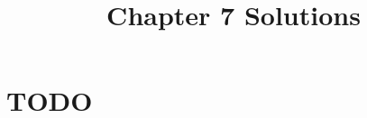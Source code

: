 \documentclass[12pt]{article}
\title{Chapter 7 Solutions}
\begin{document}
\section{TODO}
\end{document}
